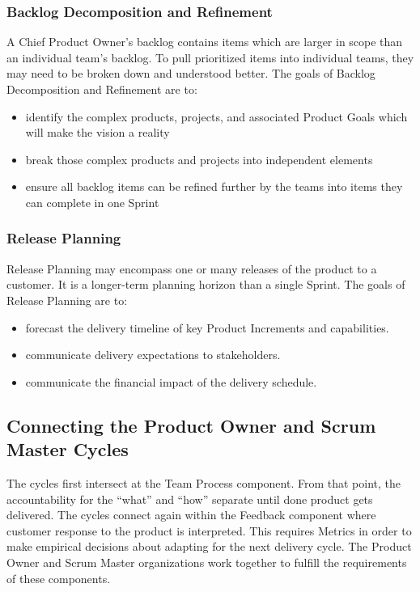 \documentclass[12pt,a4paper,parskip=full]{scrartcl}
\begin{document}
\subsubsection{Backlog Decomposition and
Refinement}\label{backlog-decomposition-and-refinement}

A Chief Product Owner's backlog contains items which are larger in scope than an individual team's backlog. To pull prioritized items into individual teams, they may need to be broken down and understood better. The goals of Backlog Decomposition and Refinement are to:

\begin{itemize}
\itemsep1pt\parskip0pt
\item
  identify the complex products, projects, and associated Product Goals which will make the vision a reality
\item
  break those complex products and projects into independent elements
\item
  ensure all backlog items can be refined further by the teams into items they can complete in one Sprint
\end{itemize}

\subsubsection{Release Planning}\label{Release-planning}

Release Planning may encompass one or many releases of the product to a customer. It is a longer-term planning horizon than a single Sprint. The goals of Release Planning are to:

\begin{itemize}
\itemsep1pt\parskip0pt
\item
  forecast the delivery timeline of key Product Increments and
  capabilities.
\item
  communicate delivery expectations to stakeholders.
\item
  communicate the financial impact of the delivery schedule.
\end{itemize}

\subsection{Connecting the Product Owner and Scrum Master
Cycles}\label{Connecting-the-product-owner-and-scrum-master-cycles}

The cycles first intersect at the Team Process component. From that point, the accountability for the ``what'' and ``how'' separate until done product gets delivered. The cycles connect again within the Feedback component where customer response to the product is interpreted. This requires Metrics in order to make empirical decisions about adapting for the next delivery cycle. The Product Owner and Scrum Master organizations work together to fulfill the requirements of these components.
\end{document}
